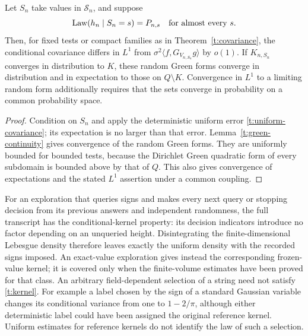 \begin{corollary}
\label{t:random-covariance}
Let $S_n$ take values in $\mathcal S_n$, and suppose
\begin{equation}\label{t:kernel}
 \operatorname{Law}(h_n\mid S_n=s)=P_{n,s}
 \quad\hbox{for almost every }s.
\end{equation}
Then, for fixed tests or compact families as in Theorem~\ref{t:covariance},
the conditional covariance differs in $L^1$ from
$\sigma^2\langle f,G_{V_{n,S_n}}g\rangle$ by $o(1)$.
If $K_{n,S_n}$ converges in distribution to $K$, these random Green forms
converge in distribution and in expectation to those on $Q\setminus K$.
Convergence in $L^1$ to a limiting random form additionally requires that
the sets converge in probability on a common probability space.
\end{corollary}
\begin{proof}
Condition on $S_n$ and apply the deterministic uniform error
\eqref{t:uniform-covariance}; its expectation is no larger than that
error.  Lemma~\ref{t:green-continuity} gives convergence of the random
Green forms.  They are uniformly bounded for bounded tests, because the
Dirichlet Green quadratic form of every subdomain is bounded above by
that of $Q$.  This also gives convergence of expectations and the stated
$L^1$ assertion under a common coupling.
\end{proof}

For an exploration that queries signs and makes every next query or
stopping decision from its previous answers and independent randomness,
the full transcript has the conditional-kernel property: its decision
indicators introduce no factor depending on an unqueried height.
Disintegrating the finite-dimensional Lebesgue density therefore leaves
exactly the uniform density with the recorded signs imposed.  An
exact-value exploration gives instead the corresponding frozen-value
kernel; it is covered only when the finite-volume estimates have been
proved for that class.  An arbitrary field-dependent selection of a
string need not satisfy \eqref{t:kernel}.  For example a label chosen by
the sign of a standard Gaussian variable changes its conditional
variance from one to $1-2/\pi$, although either deterministic label could
have been assigned the original reference kernel.  Uniform estimates for
reference kernels do not identify the law of such a selection.

